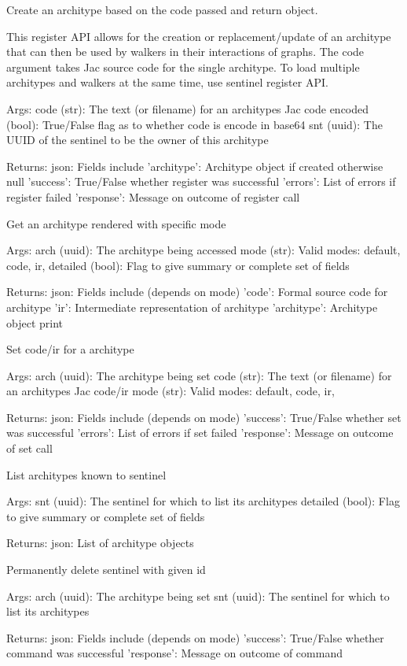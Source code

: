 {Create an architype based on the code passed and return object.

This register API allows for the creation or replacement/update of
an architype that can then be used by walkers in their interactions
of graphs. The code argument takes Jac source code for the single
architype. To load multiple architypes and walkers at the same time,
use sentinel register API.

Args:
    code (str): The text (or filename) for an architypes Jac code
    encoded (bool): True/False flag as to whether code is encode
        in base64
    snt (uuid): The UUID of the sentinel to be the owner of this
        architype

Returns:
    json: Fields include
        'architype': Architype object if created otherwise null
        'success': True/False whether register was successful
        'errors': List of errors if register failed
        'response': Message on outcome of register call}
{Get an architype rendered with specific mode

Args:
    arch (uuid): The architype being accessed
    mode (str): Valid modes: {default, code, ir, }
    detailed (bool): Flag to give summary or complete set of fields

Returns:
    json: Fields include (depends on mode)
        'code': Formal source code for architype
        'ir': Intermediate representation of architype
        'architype': Architype object print}
{Set code/ir for a architype

Args:
    arch (uuid): The architype being set
    code (str): The text (or filename) for an architypes Jac code/ir
    mode (str): Valid modes: {default, code, ir, }

Returns:
    json: Fields include (depends on mode)
        'success': True/False whether set was successful
        'errors': List of errors if set failed
        'response': Message on outcome of set call}
{List architypes known to sentinel

Args:
    snt (uuid): The sentinel for which to list its architypes
    detailed (bool): Flag to give summary or complete set of fields

Returns:
    json: List of architype objects}
{Permanently delete sentinel with given id

Args:
    arch (uuid): The architype being set
    snt (uuid): The sentinel for which to list its architypes

Returns:
    json: Fields include (depends on mode)
        'success': True/False whether command was successful
        'response': Message on outcome of command}
